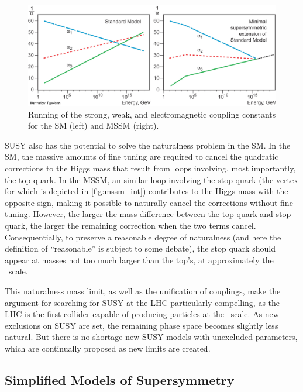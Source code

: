 \begin{centering}
\begin{figure}[!hbt]
\myfloatalign
\includegraphics[width=.9\linewidth]{figures/theory/phypub4highen.jpg}
\caption{Running of the strong, weak, and electromagnetic coupling constants for the \ac{SM} (left) and \ac{MSSM} (right). \cite{nobel2004}}
\label{fig:gut_mssm}
\end{figure}
\end{centering}

\ac{SUSY} also has the potential to solve the naturalness problem in the \ac{SM}. In the \ac{SM}, the massive amounts of fine tuning are required to cancel the quadratic corrections to the Higgs mass that result from loops involving, most importantly, the top quark. In the \ac{MSSM}, an similar loop involving the stop quark (the vertex for which is depicted in \autoref{fig:mssm_int}) contributes to the Higgs mass with the opposite sign, making it possible to naturally cancel the corrections without fine tuning. However, the larger the mass difference between the top quark and stop quark, the larger the remaining correction when the two terms cancel. Consequentially, to preserve a reasonable degree of naturalness (and here the definition of ``reasonable'' is subject to some debate), the stop quark should appear at masses not too much larger than the top's, at approximately the \tev~scale. 

This naturalness mass limit, as well as the unification of couplings, make the argument for searching for \ac{SUSY} at the \ac{LHC} particularly compelling, as the \ac{LHC} is the first collider capable of producing particles at the \tev~scale. As new exclusions on \ac{SUSY} are set, the remaining phase space becomes slightly less natural. But there is no shortage new \ac{SUSY} models with unexcluded parameters, which are continually proposed as new limits are created. 

\subsection{Simplified Models of Supersymmetry}
\label{sec:simplified_models}

